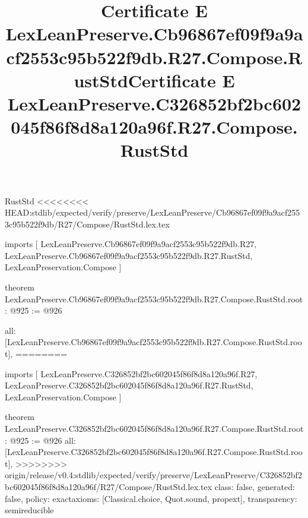 \begin{lexlean}{RustStd}
<<<<<<<< HEAD:stdlib/expected/verify/preserve/LexLeanPreserve/Cb96867ef09f9a9acf2553c95b522f9db/R27/Compose/RustStd.lex.tex
\title{Certificate E LexLeanPreserve.Cb96867ef09f9a9acf2553c95b522f9db.R27.Compose.RustStd}
\begin{coremodule}
imports [
  LexLeanPreserve.Cb96867ef09f9a9acf2553c95b522f9db.R27,
  LexLeanPreserve.Cb96867ef09f9a9acf2553c95b522f9db.R27.RustStd,
  LexLeanPreservation.Compose
]

theorem LexLeanPreserve.Cb96867ef09f9a9acf2553c95b522f9db.R27.Compose.RustStd.root : @925 := @926 {
  all: [LexLeanPreserve.Cb96867ef09f9a9acf2553c95b522f9db.R27.Compose.RustStd.root],
========
\title{Certificate E LexLeanPreserve.C326852bf2bc602045f86f8d8a120a96f.R27.Compose.RustStd}
\begin{coremodule}
imports [
  LexLeanPreserve.C326852bf2bc602045f86f8d8a120a96f.R27,
  LexLeanPreserve.C326852bf2bc602045f86f8d8a120a96f.R27.RustStd,
  LexLeanPreservation.Compose
]

theorem LexLeanPreserve.C326852bf2bc602045f86f8d8a120a96f.R27.Compose.RustStd.root : @925 := @926 {
  all: [LexLeanPreserve.C326852bf2bc602045f86f8d8a120a96f.R27.Compose.RustStd.root],
>>>>>>>> origin/release/v0.4:stdlib/expected/verify/preserve/LexLeanPreserve/C326852bf2bc602045f86f8d8a120a96f/R27/Compose/RustStd.lex.tex
  class: false,
  generated: false,
  policy: exact{axioms: [Classical.choice, Quot.sound, propext]},
  transparency: semireducible
}


\end{coremodule}}
\end{coremodule}
\end{lexlean}
